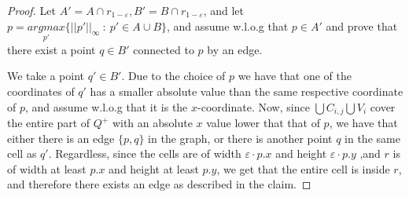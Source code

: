 \documentclass{article}
\newcommand{\eps}{\varepsilon}
\begin{document}
	\begin{proof}
		Let $A'=A\cap r_{1-\eps}, B'=B \cap r_{1-\eps}$, and let $p= \underset{p'}{argmax}\{||p'||_{\infty}~:~ p'\in A\cup B\}$, and assume w.l.o.g that $p\in A'$ and prove that there exist a point $q\in B'$ connected to $p$ by an edge.
		
		We take a point $q'\in B'$. Due to the choice of $p$ we have that one of the coordinates of $q'$ has a smaller absolute value than the same respective coordinate of $p$, and assume w.l.o.g that it is the $x$-coordinate. Now, since $\bigcup C_{i,j} \bigcup V_i$ cover the entire part of $Q^+$ with an absolute $x$ value lower that that of $p$, we have that either there is an edge $\{p,q\}$ in the graph, or there is another point $q$ in the same cell as $q'$. Regardless, since the cells are of width $\eps\cdot p.x$ and height $\eps\cdot p.y$ ,and $r$ is of width at least $p.x$ and height at least $p.y$, we get that the entire cell is inside $r$, and therefore there exists an edge as described in the claim. 

	\end{proof}
\end{document}
